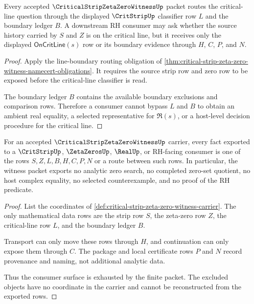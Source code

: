\begin{theorem}
\label{thm:critical-strip-zeta-zero-witness-critical-line-boundary}
Every accepted $\CriticalStripZetaZeroWitnessUp$ packet routes the critical-line question through the displayed $\CritStripUp$ classifier row $L$ and the boundary ledger $B$. A downstream RH consumer may ask whether the source history carried by $S$ and $Z$ is on the critical line, but it receives only the displayed $\mathsf{OnCritLine}(s)$ row or its boundary evidence through $H$, $C$, $P$, and $N$.
\end{theorem}
\begin{proof}
Apply the line-boundary routing obligation of \autoref{thm:critical-strip-zeta-zero-witness-namecert-obligations}. It requires the source strip row and zero row to be exposed before the critical-line classifier is read.

The boundary ledger $B$ contains the available boundary exclusions and comparison rows. Therefore a consumer cannot bypass $L$ and $B$ to obtain an ambient real equality, a selected representative for $\Re(s)$, or a host-level decision procedure for the critical line.
\end{proof}

\begin{theorem}
\label{thm:critical-strip-zeta-zero-witness-ledger-exhaustion}
For an accepted $\CriticalStripZetaZeroWitnessUp$ carrier, every fact exported to a $\CritStripUp$, $\ZetaZerosUp$, $\RealUp$, or RH-facing consumer is one of the rows $S,Z,L,B,H,C,P,N$ or a route between such rows. In particular, the witness packet exports no analytic zero search, no completed zero-set quotient, no host complex equality, no selected counterexample, and no proof of the RH predicate.
\end{theorem}
\begin{proof}
List the coordinates of \autoref{def:critical-strip-zeta-zero-witness-carrier}. The only mathematical data rows are the strip row $S$, the zeta-zero row $Z$, the critical-line row $L$, and the boundary ledger $B$.

Transport can only move these rows through $H$, and continuation can only expose them through $C$. The package and local certificate rows $P$ and $N$ record provenance and naming, not additional analytic data.

Thus the consumer surface is exhausted by the finite packet. The excluded objects have no coordinate in the carrier and cannot be reconstructed from the exported rows.
\end{proof}

